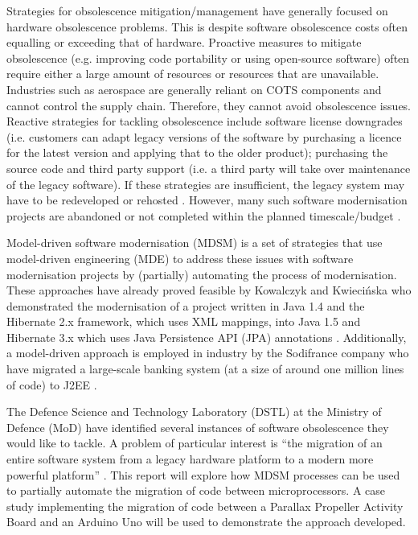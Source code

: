 \documentclass{UoYCSproject}
\begin{document}
Strategies for obsolescence mitigation/management have generally focused on hardware obsolescence problems. This is despite software obsolescence costs often equalling or exceeding that of hardware. Proactive measures to mitigate obsolescence (e.g. improving code portability or using open-source software) often require either a large amount of resources or resources that are unavailable. Industries such as aerospace are generally reliant on COTS components and cannot control the supply chain. Therefore, they cannot avoid obsolescence issues. Reactive strategies for tackling obsolescence include software license downgrades (i.e. customers can adapt legacy versions of the software by purchasing a licence for the latest version and applying that to the older product); purchasing the source code and third party support (i.e. a third party will take over maintenance of the legacy software). If these strategies are insufficient, the legacy system may have to be redeveloped or rehosted \parencite{sandborn2007obsolescence}. However, many such software modernisation projects are abandoned or not completed within the planned timescale/budget \parencite{kowalczyk2009model}. 

Model-driven software modernisation (MDSM) is a set of strategies that use model-driven engineering (MDE) to address these issues with software modernisation projects by (partially) automating the process of modernisation. These approaches have already proved feasible by Kowalczyk and Kwieci\'nska who demonstrated the modernisation of a project written in Java 1.4 and the Hibernate 2.x framework, which uses XML mappings, into Java 1.5 and Hibernate 3.x which uses Java Persistence API (JPA) annotations \parencite{kowalczyk2009model}. Additionally, a model-driven approach is employed in industry by the Sodifrance company who have migrated a large-scale banking system (at a size of around one million lines of code) to J2EE \parencite{fleurey2007model}.

The Defence Science and Technology Laboratory (DSTL) at the Ministry of Defence (MoD) have identified several instances of software obsolescence they would like to tackle. A problem of particular interest is ``the migration of an entire software system from a legacy hardware platform to a modern more powerful platform'' \parencite{gerasimou2017technical}. This report will explore how MDSM processes can be used to partially automate the migration of code between microprocessors. A case study implementing the migration of code between a Parallax Propeller Activity Board and an Arduino Uno will be used to demonstrate the approach developed.
 
\end{document}

